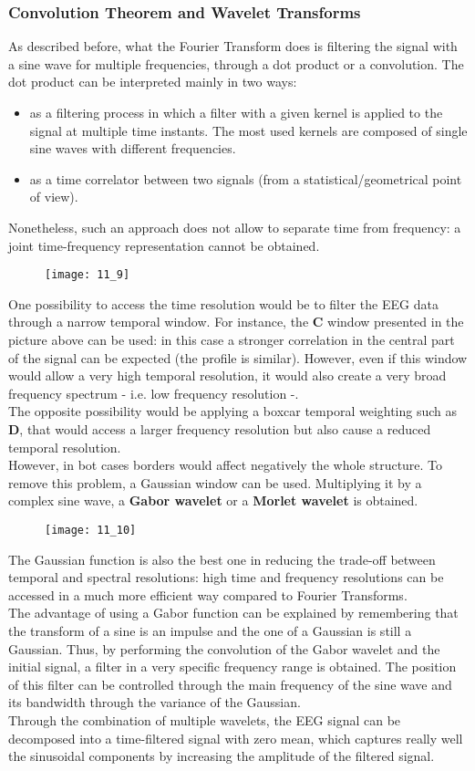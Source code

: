 \subsubsection{Convolution Theorem and Wavelet Transforms}
As described before, what the Fourier Transform does is filtering the signal with a sine wave for multiple
frequencies, through a dot product or a convolution. The dot product can be interpreted mainly in two ways:
\begin{itemize}
    \item as a filtering process in which a filter with a given kernel is applied to the signal at multiple
          time instants. The most used kernels are composed of single sine waves with different frequencies.
    \item as a time correlator between two signals (from a statistical/geometrical point of view).
\end{itemize}
Nonetheless, such an approach does not allow to separate time from frequency: a joint time-frequency
representation cannot be obtained.
\begin{figure}[H]
    \texttt{[image: 11\_9]}
    \centering
\end{figure}
One possibility to access the time resolution would be to filter the EEG data through a narrow temporal window.
For instance, the \textbf{C} window presented in the picture above can be used: in this case a stronger
correlation in the central part of the signal can be expected (the profile is similar). However, even if this
window would allow a very high temporal resolution, it would also create a very broad frequency spectrum - i.e.
low frequency resolution -.\\
The opposite possibility would be applying a boxcar temporal weighting such as \textbf{D}, that would access a
larger frequency resolution but also cause a reduced temporal resolution.\\
However, in bot cases borders would affect negatively the whole structure. To remove this problem, a Gaussian
window can be used. Multiplying it by a complex sine wave, a \textbf{Gabor wavelet} or a
\textbf{Morlet wavelet} is obtained.
\begin{figure}[H]
    \texttt{[image: 11\_10]}
    \centering
\end{figure}
The Gaussian function is also the best one in reducing the trade-off between
temporal and spectral resolutions: high time and frequency resolutions can be accessed in a much more efficient
way compared to Fourier Transforms.\\
The advantage of using a Gabor function can be explained by remembering that the transform of a sine is an
impulse and the one of a Gaussian is still a Gaussian. Thus, by performing the convolution of the Gabor wavelet
and the initial signal, a filter in a very specific frequency range is obtained. The position of this filter
can be controlled through the main frequency of the sine wave and its bandwidth through the variance of the Gaussian.\\
Through the combination of multiple wavelets, the EEG signal can be decomposed into a time-filtered signal
with zero mean, which captures really well the sinusoidal components by increasing the amplitude of the filtered
signal.
